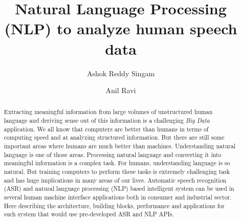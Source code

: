\documentclass[sigconf]{acmart}
\begin{document}
\title{Natural Language Processing (NLP) to analyze human speech data}

\author{Ashok Reddy Singam}

\author{Anil Ravi}

\begin{abstract}
Extracting meaningful information from large volumes of unstructured human language and deriving sense out of this information is a challenging \textit{Big Data} application. We all know that computers are better than humans in terms of computing speed and at analyzing structured information. But there are still some important areas where humans are much better than machines. Understanding natural language is one of those areas. Processing natural language and converting it into meaningful information is a complex task. For humans, understanding language is so natural. But training computers to perform these tasks is extremely challenging task and has huge implications in many areas of our lives. Automatic speech recognition (ASR) and natural language processing (NLP) based intelligent system can be  used in several human machine interface applications both in consumer and industrial sector. Here describing the architecture, building blocks, performance and applications for such system that would use pre-developed ASR and NLP APIs.
\end{abstract}


\maketitle
\end{document}
